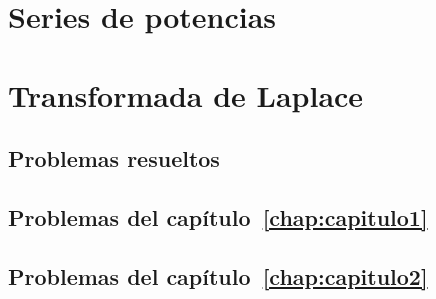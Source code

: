 \documentclass[a4paper, 10pt]{book}
\begin{document}
\chapter{Series de potencias}
\label{chap:capitulo5}


\chapter{Transformada de Laplace}
\label{chap:capitulo6}


\begin{appendices}

\chapter{Problemas resueltos}

\section[Problemas del capítulo 1]{Problemas del capítulo~\ref{chap:capitulo1}}


\section[Problemas del capítulo 2]{Problemas del capítulo~\ref{chap:capitulo2}}


\end{appendices}

\backmatter

\listoffigures
{}
\listoftables
\end{document}
